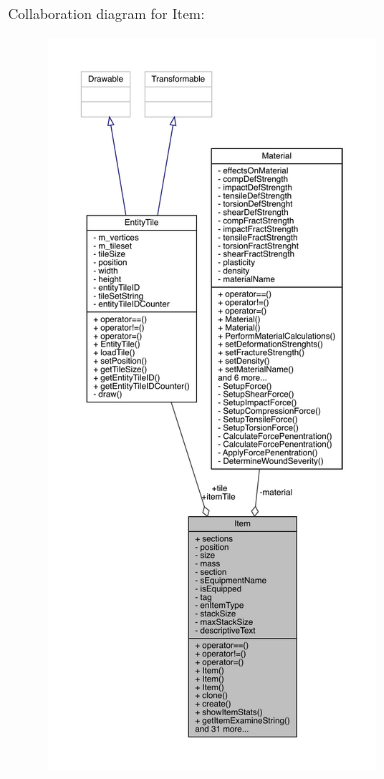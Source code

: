 Collaboration diagram for Item\+:
\nopagebreak
\begin{figure}[H]
\begin{center}
\leavevmode
\includegraphics[height=550pt]{d2/d8b/class_item__coll__graph}
\end{center}
\end{figure}
